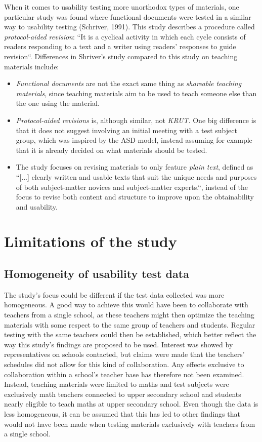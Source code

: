 When it comes to usability testing more unorthodox types of materials, one particular study was found where functional documents were tested in a similar way to usability testing (Schriver, 1991). This study describes a procedure called \textit{protocol-aided revision}: “It is a cyclical activity in which each cycle consists of readers responding to a text and a writer using readers' responses to guide revision“. Differences in Shriver's study compared to this study on teaching materials include:
\begin{itemize}
\item \textit{Functional documents} are not the exact same thing as \textit{shareable teaching materials}, since teaching materials aim to be used to teach someone else than the one using the material.
\item \textit{Protocol-aided revisions} is, although similar, not \textit{KRUT}. One big difference is that it does not suggest involving an initial meeting with a test subject group, which was inspired by the ASD-model, instead assuming for example that it is already decided on what materials should be tested.
\item The study focuses on revising materials to only feature \textit{plain text}, defined as “[...] clearly written and usable texts that suit the unique needs and purposes of both subject-matter novices and subject-matter experts.“, instead of the focus to revise both content and structure to improve upon the obtainability and usability.
\end{itemize}

\section{Limitations of the study}
\subsection{Homogeneity of usability test data}
The study's focus could be different if the test data collected was more homogeneous. A good way to achieve this would have been to collaborate with teachers from a single school, as these teachers might then optimize the teaching materials with some respect to the same group of teachers and students. Regular testing with the same teachers could then be established, which better reflect the way this study's findings are proposed to be used. Interest was showed by representatives on schools contacted, but claims were made that the teachers' schedules did not allow for this kind of collaboration. 
Any effects exclusive to collaboration within a school's teacher base has therefore not been examined. Instead, teaching materials were limited to maths and test subjects were exclusively math teachers connected to upper secondary school and students nearly eligible to teach maths at upper secondary school. Even though the data is less homogeneous, it can be assumed that this has led to other findings that would not have been made when testing materials exclusively with teachers from a single school.

